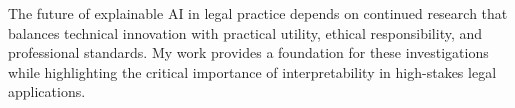 The future of explainable AI in legal practice depends on continued research that balances technical innovation with practical utility, ethical responsibility, and professional standards. My work provides a foundation for these investigations while highlighting the critical importance of interpretability in high-stakes legal applications.